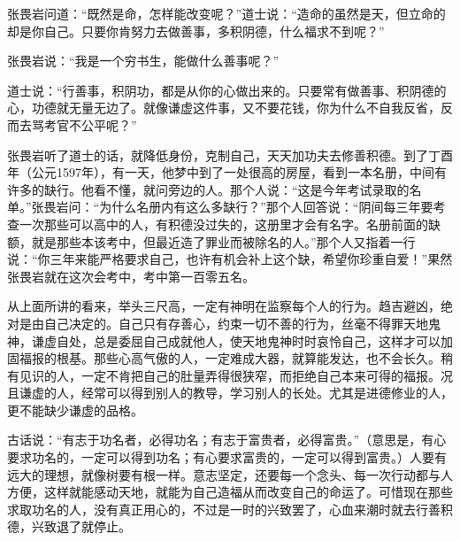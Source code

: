 \documentclass[12pt,UTF8]{ctexbook}
\begin{document}
张畏岩问道：“既然是命，怎样能改变呢？”道士说：“造命的虽然是天，但立命的却是你自己。只要你肯努力去做善事，多积阴德，什么福求不到呢？”

张畏岩说：“我是一个穷书生，能做什么善事呢？”

道士说：“行善事，积阴功，都是从你的心做出来的。只要常有做善事、积阴德的心，功德就无量无边了。就像谦虚这件事，又不要花钱，你为什么不自我反省，反而去骂考官不公平呢？”

张畏岩听了道士的话，就降低身份，克制自己，天天加功夫去修善积德。到了丁酉年（公元1597年），有一天，他梦中到了一处很高的房屋，看到一本名册，中间有许多的缺行。他看不懂，就问旁边的人。那个人说：“这是今年考试录取的名单。”张畏岩问：“为什么名册内有这么多缺行？”那个人回答说：“阴间每三年要考查一次那些可以高中的人，有积德没过失的，这册里才会有名字。名册前面的缺额，就是那些本该考中，但最近造了罪业而被除名的人。”那个人又指着一行说：“你三年来能严格要求自己，也许有机会补上这个缺，希望你珍重自爱！”果然张畏岩就在这次会考中，考中第一百零五名。

从上面所讲的看来，举头三尺高，一定有神明在监察每个人的行为。趋吉避凶，绝对是由自己决定的。自己只有存善心，约束一切不善的行为，丝毫不得罪天地鬼神，谦虚自处，总是委屈自己成就他人，使天地鬼神时时哀怜自己，这样才可以加固福报的根基。那些心高气傲的人，一定难成大器，就算能发达，也不会长久。稍有见识的人，一定不肯把自己的肚量弄得很狭窄，而拒绝自己本来可得的福报。况且谦虚的人，经常可以得到别人的教导，学习别人的长处。尤其是进德修业的人，更不能缺少谦虚的品格。

古话说：“有志于功名者，必得功名；有志于富贵者，必得富贵。”（意思是，有心要求功名的，一定可以得到功名；有心要求富贵的，一定可以得到富贵。）人要有远大的理想，就像树要有根一样。意志坚定，还要每一个念头、每一次行动都与人方便，这样就能感动天地，就能为自己造福从而改变自己的命运了。可惜现在那些求取功名的人，没有真正用心的，不过是一时的兴致罢了，心血来潮时就去行善积德，兴致退了就停止。
\backmatter
\end{document}
